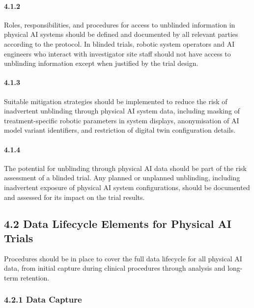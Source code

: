 \paragraph{4.1.2} Roles, responsibilities, and procedures for access to unblinded information in physical AI systems should be defined and documented by all relevant parties according to the protocol. In blinded trials, robotic system operators and AI engineers who interact with investigator site staff should not have access to unblinding information except when justified by the trial design.

\paragraph{4.1.3} Suitable mitigation strategies should be implemented to reduce the risk of inadvertent unblinding through physical AI system data, including masking of treatment-specific robotic parameters in system displays, anonymisation of AI model variant identifiers, and restriction of digital twin configuration details.

\paragraph{4.1.4} The potential for unblinding through physical AI data should be part of the risk assessment of a blinded trial. Any planned or unplanned unblinding, including inadvertent exposure of physical AI system configurations, should be documented and assessed for its impact on the trial results.

\subsection{4.2 Data Lifecycle Elements for Physical AI Trials}

Procedures should be in place to cover the full data lifecycle for all physical AI data, from initial capture during clinical procedures through analysis and long-term retention.

\subsubsection{4.2.1 Data Capture}

